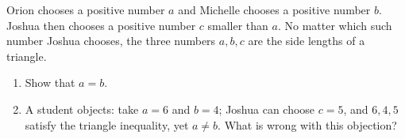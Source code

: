 Orion chooses a positive number $a$ and Michelle chooses a positive number $b$. Joshua then chooses a positive number $c$ smaller than $a$. No matter which such number Joshua chooses, the three numbers $a,b,c$ are the side lengths of a triangle.
\begin{enumerate}
\item[(a)] Show that $a=b$.
\item[(b)] A student objects: take $a=6$ and $b=4$; Joshua can choose $c=5$, and $6,4,5$ satisfy the triangle inequality, yet $a\ne b$. What is wrong with this objection?
\end{enumerate}

